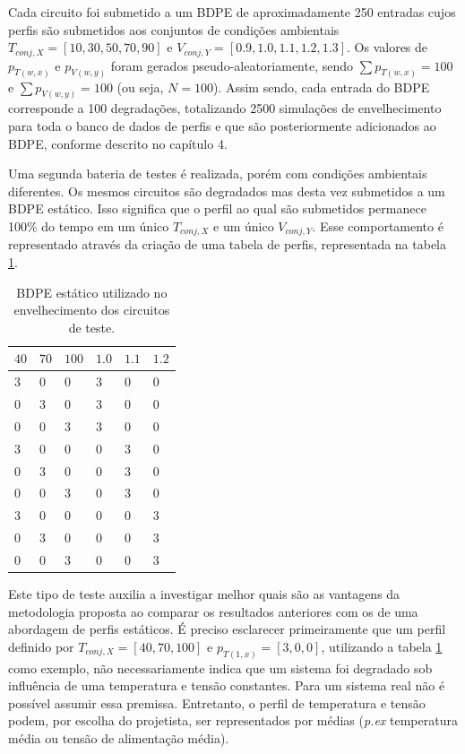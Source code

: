 Cada circuito foi submetido a um BDPE de aproximadamente 250 entradas cujos perfis são submetidos aos conjuntos de condições ambientais $T_{conj,X}=[10, 30, 50, 70, 90]$ e $V_{conj,Y}=[0.9, 1.0, 1.1, 1.2, 1.3]$. Os valores de $p_{T(w,x)}$ e $p_{V(w,y)}$ foram gerados pseudo-aleatoriamente, sendo $\sum p_{T(w,x)}=100$ e $\sum p_{V(w,y)}=100$ (ou seja, $N=100$). Assim sendo, cada entrada do BDPE corresponde a 100 degradações, totalizando 2500 simulações de envelhecimento para toda o banco de dados de perfis e que são posteriormente adicionados ao BDPE, conforme descrito no capítulo 4.

Uma segunda bateria de testes é realizada, porém com condições ambientais diferentes. Os mesmos circuitos são degradados mas desta vez submetidos a um BDPE estático. Isso significa que o perfil ao qual são submetidos permanece 100\% do tempo em um único $T_{conj,X}$ e um único $V_{conj,Y}$. Esse comportamento é representado através da criação de uma tabela de perfis, representada na tabela \ref{tb:BDPE_estatico}.

\begin{table}[H]
	\centering
	\caption{BDPE estático utilizado no envelhecimento dos circuitos de teste.}
	\begin{tabular}{@{}l|l|l|l|l|l@{}}
		\toprule
		$40$ & $70$ & $100$ & $1.0$ & $1.1$ & $1.2$ \\ \midrule
		$3$ & $0$ & $0$ & $3$ & $0$ & $0$ \\
		$0$ & $3$ & $0$ & $3$ & $0$ & $0$ \\
		$0$ & $0$ & $3$ & $3$ & $0$ & $0$ \\
		$3$ & $0$ & $0$ & $0$ & $3$ & $0$ \\
		$0$ & $3$ & $0$ & $0$ & $3$ & $0$ \\
		$0$ & $0$ & $3$ & $0$ & $3$ & $0$ \\
		$3$ & $0$ & $0$ & $0$ & $0$ & $3$ \\
		$0$ & $3$ & $0$ & $0$ & $0$ & $3$ \\
		$0$ & $0$ & $3$ & $0$ & $0$ & $3$ \\
		\bottomrule
	\end{tabular}
	\label{tb:BDPE_estatico}
\end{table}
Este tipo de teste auxilia a investigar melhor quais são as vantagens da metodologia proposta ao comparar os resultados anteriores com os de uma abordagem de perfis estáticos. É preciso esclarecer primeiramente que um perfil definido por $T_{conj,X}=[40,70,100]$ e $p_{T(1,x)}=[3,0,0]$, utilizando a tabela \ref{tb:BDPE_estatico} como exemplo, não necessariamente indica que um sistema foi degradado sob influência de uma temperatura e tensão constantes. Para um sistema real não é possível assumir essa premissa. Entretanto, o perfil de temperatura e tensão podem, por escolha do projetista, ser representados por médias (\textit{p.ex} temperatura média ou tensão de alimentação média).

